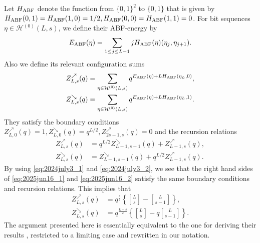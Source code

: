 \documentclass[sn-mathphys-num]{sn-jnl}%
\theoremstyle{thmstyleone}%
\theoremstyle{thmstyletwo}%
\theoremstyle{thmstylethree}%
\begin{document}
\begin{appendices}
Let $H_{\rm ABF}$ denote the function from $ \{0,1\}^2$ to $\{0,1\}$ that is given by
$H_{\rm ABF}(0,1)=H_{\rm ABF}(1,0)=1/2, H_{\rm ABF}(0,0)=H_{\rm ABF}(1,1)=0$.
For bit sequences $\eta \in \mathcal{H}^{(0)} (L,s)$, we define their ABF-energy by
\begin{equation*}%
E_{\rm ABF}(\eta) = \sum_{1 \leq j \leq L-1} j H_{\rm ABF}(\eta)(\eta_j, \eta_{j+1}).
\end{equation*}
Also we define its relevant configuration sums
\begin{align*}
Z_{L,s}^{\nearrow} (q)&= \sum_{\eta \in \mathcal{H}^{(0)} (L,s)} q^{E_{\rm ABF}(\eta) + L H_{\rm ABF}(\eta_L,0)} ,\\
Z_{L,s}^{\searrow} (q)&=\sum_{\eta \in \mathcal{H}^{(0)} (L,s)} q^{E_{\rm ABF}(\eta) + L H_{\rm ABF}(\eta_L,1)}.
\end{align*}
They satisfy the boundary conditions $Z_{L,0}^{\nearrow} (q) =1, Z_{L,0}^{\searrow} (q) = q^{L/2},
Z_{2s-1,s}^{\nearrow} (q) =0$ and the recursion relations \cite[(2.6.2) and (2.6.3)]{ABF}
\begin{align*}
Z_{L,s}^{\nearrow} (q)&= q^{L/2}Z_{L-1,s-1}^{\searrow} (q) + Z_{L-1,s}^{\nearrow} (q),\\
Z_{L,s}^{\searrow} (q)&= Z_{L-1,s-1}^{\searrow} (q) + q^{L/2}Z_{L-1,s}^{\nearrow} (q).
\end{align*}
By using \eqref{eq:2024july3_1} and \eqref{eq:2024july3_2}, we see that
the right hand sides of
\eqref{eq:2025jun16_1} and \eqref{eq:2025jun16_2} satisfy
the same boundary conditions and recursion relations.
This implies that
\begin{align}
Z_{L,s}^{\nearrow} (q)&= q^{\frac{s}{2}} \left\{
{ L \brack s } -
 { L \brack s-1 }\right\}, \nonumber\\
Z_{L,s}^{\searrow} (q)&= q^{\frac{L-s}{2}} \left\{
{ L \brack s } -
q { L \brack s-1 }\right\}.\label{eq:2025jun16_4}
\end{align}
The argument presented here is essentially equivalent to the one for deriving
their results \cite[Lemma 2.6.1]{ABF},
restricted to a limiting case and rewritten in our notation.


\end{appendices}
\end{document}
